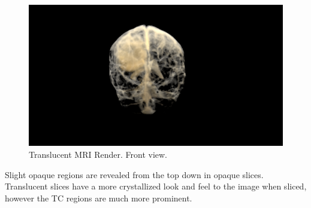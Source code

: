 \begin{figure}[h]
 \centering %
 \includegraphics[width=\columnwidth]{pictures/bt-alphalimon-back.png}
 \caption{Translucent MRI Render. Front view.}
 \label{fig:alphared-front}
\end{figure}

Slight opaque regions are revealed from the top down in opaque slices. Translucent slices have a more crystallized look and feel to the image when sliced, however the TC regions are much more prominent.